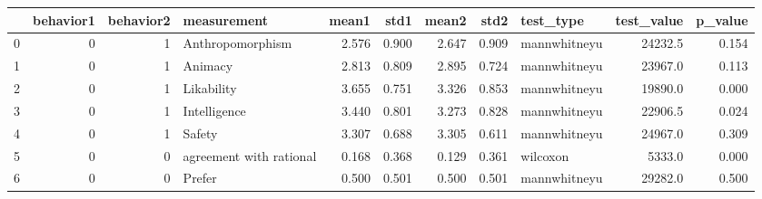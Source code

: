 \begin{tabular}{lrrlrrrrlrr}
\toprule
{} &  behavior1 &  behavior2 &              measurement &  mean1 &   std1 &  mean2 &   std2 &     test\_type &  test\_value &  p\_value \\
\midrule
0 &          0 &          1 &         Anthropomorphism &  2.576 &  0.900 &  2.647 &  0.909 &  mannwhitneyu &     24232.5 &    0.154 \\
1 &          0 &          1 &                  Animacy &  2.813 &  0.809 &  2.895 &  0.724 &  mannwhitneyu &     23967.0 &    0.113 \\
2 &          0 &          1 &               Likability &  3.655 &  0.751 &  3.326 &  0.853 &  mannwhitneyu &     19890.0 &    0.000 \\
3 &          0 &          1 &             Intelligence &  3.440 &  0.801 &  3.273 &  0.828 &  mannwhitneyu &     22906.5 &    0.024 \\
4 &          0 &          1 &                   Safety &  3.307 &  0.688 &  3.305 &  0.611 &  mannwhitneyu &     24967.0 &    0.309 \\
5 &          0 &          0 &  agreement with rational &  0.168 &  0.368 &  0.129 &  0.361 &      wilcoxon &      5333.0 &    0.000 \\
6 &          0 &          0 &                   Prefer &  0.500 &  0.501 &  0.500 &  0.501 &  mannwhitneyu &     29282.0 &    0.500 \\
\bottomrule
\end{tabular}
